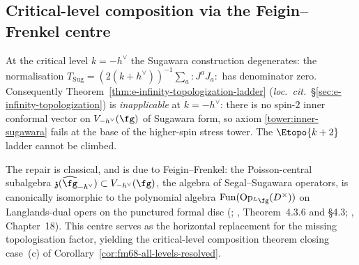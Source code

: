 \subsection{Critical-level composition via the Feigin--Frenkel
 centre}
\label{subsec:ff-chirhoch-critical}

At the critical level $k=-h^\vee$ the Sugawara construction
degenerates: the normalisation
$T_{\mathrm{Sug}} = (2(k+h^\vee))^{-1}\sum_a {:}J^a J_a{:}$ has
denominator zero. Consequently
Theorem~\ref{thm:e-infinity-topologization-ladder}
(\emph{loc.\ cit.}\ \S\ref{sec:e-infinity-topologization})
is \emph{inapplicable} at $k=-h^\vee$: there is no spin-$2$ inner
conformal vector on $V_{-h^\vee}(\fg)$ of Sugawara form, so axiom
\ref{tower:inner-sugawara} fails at the base of the higher-spin
stress tower. The $\Etopo{k+2}$ ladder cannot be climbed.

The repair is classical, and is due to Feigin--Frenkel: the
Poisson-central subalgebra
$\mathfrak{z}(\widehat{\fg}_{-h^\vee}) \subset V_{-h^\vee}(\fg)$,
the algebra of Segal--Sugawara operators, is canonically isomorphic
to the polynomial algebra $\mathrm{Fun}(\mathrm{Op}_{{}^L\fg}(D^\times))$
on Langlands-dual opers on the punctured formal disc
(\cite{Feigin-Frenkel}; \cite{FrenkelLanglands},
Theorem~4.3.6 and \S 4.3; \cite{FBZ04}, Chapter~18). This
centre serves as the horizontal replacement for the missing
topologisation factor, yielding the critical-level
composition theorem closing case~(c) of
Corollary~\ref{cor:fm68-all-levels-resolved}.


